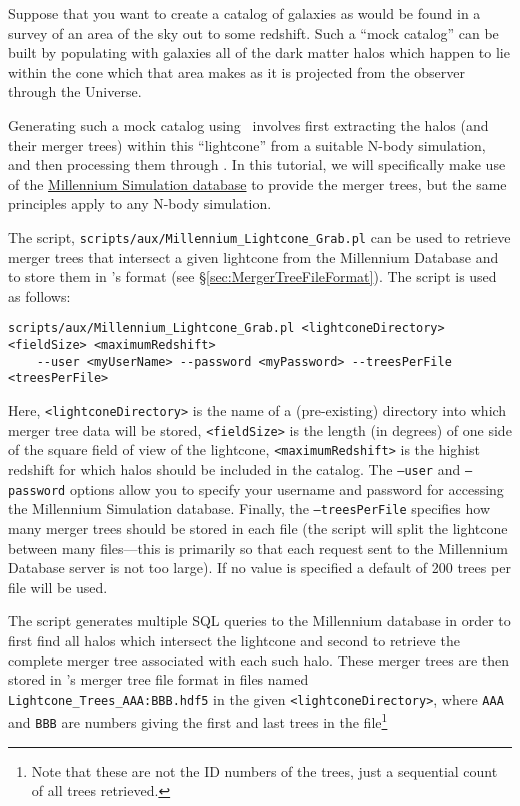 Suppose that you want to create a catalog of galaxies as would be found in a survey of an area of the sky out to some redshift. Such a ``mock catalog'' can be built by populating with galaxies all of the dark matter halos which happen to lie within the cone which that area makes as it is projected from the observer through the Universe.

Generating such a mock catalog using \glc\ involves first extracting the halos (and their merger trees) within this ``lightcone'' from a suitable N-body simulation, and then processing them through \glc. In this tutorial, we will specifically make use of the \href{http://gavo.mpa-garching.mpg.de/MyMillennium3/MyDB}{Millennium Simulation database} to provide the merger trees, but the same principles apply to any N-body simulation.

The script, {\tt scripts/aux/Millennium\_Lightcone\_Grab.pl} can be used to retrieve merger trees that intersect a given lightcone from the Millennium Database and to store them in \glc's format (see \S\ref{sec:MergerTreeFileFormat}). The script is used as follows:
\begin{verbatim}
scripts/aux/Millennium_Lightcone_Grab.pl <lightconeDirectory> <fieldSize> <maximumRedshift>
    --user <myUserName> --password <myPassword> --treesPerFile <treesPerFile>
\end{verbatim}
Here, {\tt \textless lightconeDirectory\textgreater} is the name of a (pre-existing) directory into which merger tree data will be stored, {\tt \textless fieldSize\textgreater} is the length (in degrees) of one side of the square field of view of the lightcone, {\tt \textless maximumRedshift\textgreater} is the highist redshift for which halos should be included in the catalog. The {\tt --user} and {\tt --password} options allow you to specify your username and password for accessing the Millennium Simulation database. Finally, the {\tt --treesPerFile} specifies how many merger trees should be stored in each file (the script will split the lightcone between many files---this is primarily so that each request sent to the Millennium Database server is not too large). If no value is specified a default of 200 trees per file will be used.

The script generates multiple SQL queries to the Millennium database in order to first find all halos which intersect the lightcone and second to retrieve the complete merger tree associated with each such halo. These merger trees are then stored in \glc's merger tree file format in files named {\tt Lightcone\_Trees\_AAA:BBB.hdf5} in the given {\tt \textless lightconeDirectory\textgreater}, where {\tt AAA} and {\tt BBB} are numbers giving the first and last trees in the file\footnote{Note that these are not the ID numbers of the trees, just a sequential count of all trees retrieved.}

